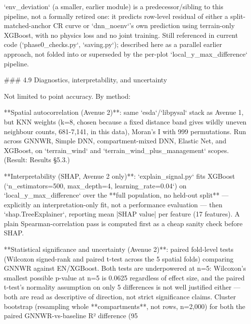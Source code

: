 `env_deviation` (a smaller, earlier module) is a predecessor/sibling to this pipeline, not a formally retired one: it predicts row-level residual of either a split-matched-anchor CR curve or `dnn_noenv`'s own prediction using terrain-only XGBoost, with no physics loss and no joint training. Still referenced in current code (`phase0_checks.py`, `saving.py`); described here as a parallel earlier approach, not folded into or superseded by the per-plot `local_y_max_difference` pipeline.

### 4.9 Diagnostics, interpretability, and uncertainty

Not limited to point accuracy. By method:

**Spatial autocorrelation (Avenue 2)**: same `esda`/`libpysal` stack as Avenue 1, but KNN weights (k=8, chosen because a fixed distance band gives wildly uneven neighbour counts, 681-7,141, in this data), Moran's I with 999 permutations. Run across GNNWR, Simple DNN, compartment-mixed DNN, Elastic Net, and XGBoost, on `terrain_wind` and `terrain_wind_plus_management` scopes. (Result: Results §5.3.)

**Interpretability (SHAP, Avenue 2 only)**: `explain_signal.py` fits XGBoost (`n_estimators=500, max_depth=4, learning_rate=0.04`) on `local_y_max_difference` over the **full population, no held-out split** — explicitly an interpretation-only fit, not a performance evaluation — then `shap.TreeExplainer`, reporting mean |SHAP value| per feature (17 features). A plain Spearman-correlation pass is computed first as a cheap sanity check before SHAP.

**Statistical significance and uncertainty (Avenue 2)**: paired fold-level tests (Wilcoxon signed-rank and paired t-test across the 5 spatial folds) comparing GNNWR against EN/XGBoost. Both tests are underpowered at n=5: Wilcoxon's smallest possible p-value at n=5 is 0.0625 regardless of effect size, and the paired t-test's normality assumption on only 5 differences is not well justified either — both are read as descriptive of direction, not strict significance claims. Cluster bootstrap (resampling whole **compartments**, not rows, n=2,000) for both the paired GNNWR-vs-baseline R² difference (95%

